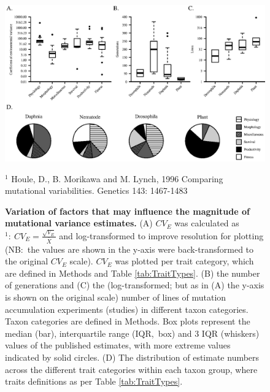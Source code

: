 \newpage
\FloatBarrier
\begin{figure}
    \centering
    \includegraphics{Supp/Chp2_Meta/FigS2_11.02.22_45.eps}
    \caption[Variation of factors that may influence the magnitude of mutational variance estimates.]{\textbf{Variation of factors that may influence the magnitude of mutational variance estimates.} (A) $CV_E$ was calculated as$^1{:}~CV_E = \frac{\sqrt{V_E}}{\bar{X}}$ and log-transformed to improve resolution for plotting (NB:~the values are shown in the y-axis were back-transformed to the original $CV_E$ scale). $CV_E$ was plotted per trait category, which are defined in Methods and Table \ref{tab:TraitTypes}. (B) the number of generations and (C) the (log-transformed; but as in (A) the y-axis is shown on the original scale) number of lines of mutation accumulation experiments (studies) in different taxon categories. Taxon categories are defined in Methods. Box plots represent the median (bar), interquartile range (IQR,~box) and 3 IQR (whiskers) values of the published estimates, with more extreme values indicated by solid circles. (D) The distribution of estimate numbers across the different trait categories within each taxon group, where traits definitions as per Table \ref{tab:TraitTypes}. }
    \label{fig:S2metaPred}
    \small
    \vspace{0.5cm}
\noindent $^1$ Houle, D., B. Morikawa and M. Lynch, 1996 Comparing mutational variabilities. Genetics 143: 1467-1483
\normalsize
\end{figure}

